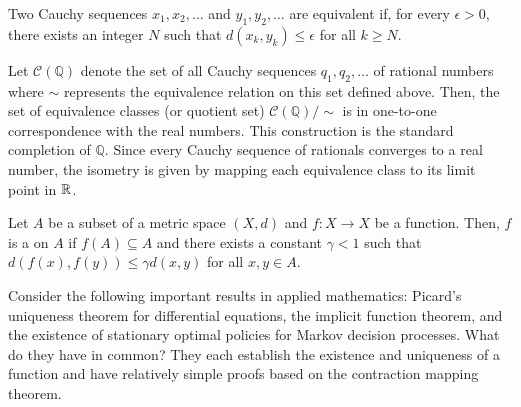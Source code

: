 \begin{definition}
Two Cauchy sequences $x_1, x_2, \ldots$ and $y_1, y_2, \ldots$ are equivalent if, for every $\epsilon >0$, there exists an integer $N$ such that $d (x_k, y_k) \leq \epsilon$ for all $k \geq N$.
\end{definition}

\begin{example}
Let $\mathcal{C}(\mathbb{Q})$ denote the set of all Cauchy sequences $q_1, q_2, \ldots$ of rational numbers where $\sim$ represents the equivalence relation on this set defined above.
Then, the set of equivalence classes (or quotient set) $\mathcal{C}(\mathbb{Q}) / \! \sim$ is in one-to-one correspondence with the real numbers.
This construction is the standard completion of $\mathbb{Q}$.
Since every Cauchy sequence of rationals converges to a real number, the isometry is given by mapping each equivalence class to its limit point in $\mathbb{R}$.
\end{example}

\begin{definition}
Let $A$ be a subset of a metric space $(X,d)$ and $f \colon X \rightarrow X$ be a function.
Then, $f$ is a  on $A$ if $f(A) \subseteq A$ and there exists a constant $\gamma < 1$ such that $d \left( f(x),f(y) \right) \leq \gamma  d(x,y)$ for all $x,y\in A$.
\end{definition}

Consider the following important results in applied mathematics: Picard's uniqueness theorem for differential equations, the implicit function theorem, and the existence of stationary optimal policies for Markov decision processes.
What do they have in common?
They each establish the existence and uniqueness of a function and have relatively simple proofs based on the contraction mapping theorem.

